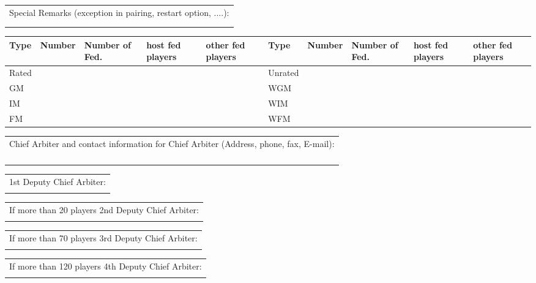 \documentclass[11pt, a4paper]{article}
\begin{document}
\begin{table}[ht]
\noindent\begin{tabular}{|p{16.4cm}|}
Special Remarks (exception in pairing, restart option, ....):\\
\\
\\
\hline
\end{tabular}

\noindent\begin{tabular}{|p{1.3cm}|p{1.25cm}|p{1.25cm}|p{1.25cm}|p{1.25cm}|p{1.3cm}|p{1.25cm}|p{1.25cm}|p{1.25cm}|p{1.25cm}|}
Type&Number&Number of Fed.&host fed players&other fed players&Type&Number&Number of Fed.&host fed players&other fed players\\
\hline
Rated& & & & &Unrated& & & & \\
\hline
GM& & & & &WGM& & & & \\
\hline
IM& & & & &WIM& & & & \\
\hline
FM& & & & &WFM& & & & \\
\hline
\end{tabular}


\noindent\begin{tabular}{|p{16.4cm}|}
Chief Arbiter and contact information for Chief Arbiter (Address, phone, fax, E-mail):\\
{\normalsize}\\
{\normalsize}\\
{\normalsize}\\
{\normalsize}\\
\hline
\end{tabular}

\noindent\begin{tabular}{|p{16.4cm}|}
1st Deputy Chief Arbiter:\\
{\normalsize}\\
\hline
\end{tabular}

\noindent\begin{tabular}{|p{16.4cm}|}
If more than 20 players 2nd Deputy Chief Arbiter:\\
{\normalsize}\\
\hline
\end{tabular}

\noindent\begin{tabular}{|p{16.4cm}|}
If more than 70 players 3rd Deputy Chief Arbiter:\\
{\normalsize}\\
\hline
\end{tabular}

\noindent\begin{tabular}{|p{16.4cm}|}
If more than 120 players 4th Deputy Chief Arbiter:\\
{\normalsize}\\
\hline
\end{tabular}


\end{table}

\end{document}
